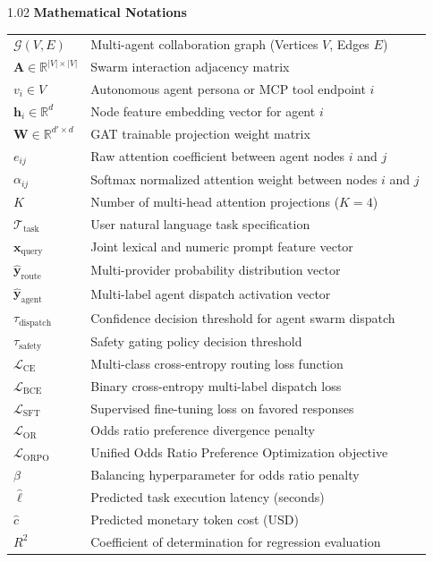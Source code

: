 \begin{spacing}{1.02}
\vspace{10pt}
\noindent \textbf{Mathematical Notations}
\vspace{4pt}

\noindent\begin{tabular*}{\textwidth}{@{\extracolsep{\fill}}p{2.8cm} p{11.2cm}@{}}
$\mathcal{G}(V, E)$ & Multi-agent collaboration graph (Vertices $V$, Edges $E$) \\
$\mathbf{A} \in \mathbb{R}^{|V| \times |V|}$ & Swarm interaction adjacency matrix \\
$v_i \in V$ & Autonomous agent persona or MCP tool endpoint $i$ \\
$\mathbf{h}_i \in \mathbb{R}^d$ & Node feature embedding vector for agent $i$ \\
$\mathbf{W} \in \mathbb{R}^{d' \times d}$ & GAT trainable projection weight matrix \\
$e_{ij}$ & Raw attention coefficient between agent nodes $i$ and $j$ \\
$\alpha_{ij}$ & Softmax normalized attention weight between nodes $i$ and $j$ \\
$K$ & Number of multi-head attention projections ($K = 4$) \\
$\mathcal{T}_{\text{task}}$ & User natural language task specification \\
$\mathbf{x}_{\text{query}}$ & Joint lexical and numeric prompt feature vector \\
$\hat{\mathbf{y}}_{\text{route}}$ & Multi-provider probability distribution vector \\
$\hat{\mathbf{y}}_{\text{agent}}$ & Multi-label agent dispatch activation vector \\
$\tau_{\text{dispatch}}$ & Confidence decision threshold for agent swarm dispatch \\
$\tau_{\text{safety}}$ & Safety gating policy decision threshold \\
$\mathcal{L}_{\text{CE}}$ & Multi-class cross-entropy routing loss function \\
$\mathcal{L}_{\text{BCE}}$ & Binary cross-entropy multi-label dispatch loss \\
$\mathcal{L}_{\text{SFT}}$ & Supervised fine-tuning loss on favored responses \\
$\mathcal{L}_{\text{OR}}$ & Odds ratio preference divergence penalty \\
$\mathcal{L}_{\text{ORPO}}$ & Unified Odds Ratio Preference Optimization objective \\
$\beta$ & Balancing hyperparameter for odds ratio penalty \\
$\hat{\ell}$ & Predicted task execution latency (seconds) \\
$\hat{c}$ & Predicted monetary token cost (USD) \\
$R^2$ & Coefficient of determination for regression evaluation \\
\end{tabular*}
\end{spacing}

\thispagestyle{plain}
